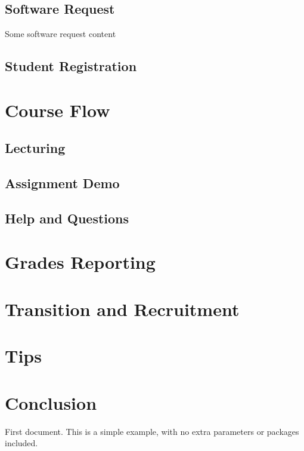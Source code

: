 \documentclass[12pt]{article}
\begin{document}
    \subsection{Software Request}
        Some software request content
    \subsection{Student Registration}
\newpage

\section{Course Flow}
    \subsection{Lecturing}
    \subsection{Assignment Demo}
    \subsection{Help and Questions}
\newpage

\section{Grades Reporting}
\newpage

\section{Transition and Recruitment}
\newpage

\section{Tips}


\newpage

\section{Conclusion}



   First document. This is a simple example, with no 
   extra parameters or packages included.
\end{document}
